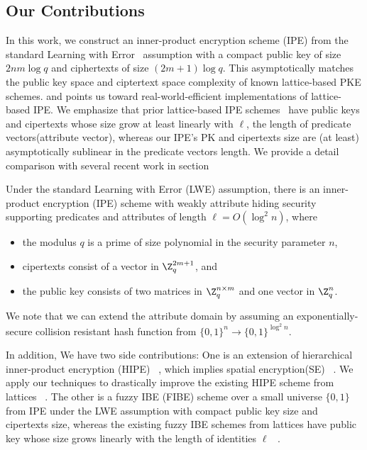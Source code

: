 \subsection{Our Contributions}
In this work, we construct an inner-product encryption scheme (IPE) from the standard Learning with Error~ \cite{STOC:Regev05} assumption with a compact public key of size $2nm\log q$ and ciphertexts of size $(2m+1)\log q$. This asymptotically matches the public key space and ciptertext space complexity of known lattice-based PKE schemes. and points us toward real-world-efficient implementations of lattice-based IPE. We emphasize that prior lattice-based IPE schemes~ \cite{AC:AgrFreVai11, PKC:Xagawa13} have public keys and cipertexts whose size grow at least linearly with $\ell$, the length of predicate vectors(attribute vector), whereas our IPE's PK and cipertexts size are (at least) asymptotically sublinear in the predicate vectors length. We provide a detail comparison with several recent work in section
\begin{theorem}[Main]
Under the standard Learning with Error (LWE) assumption, there is an inner-product encryption (IPE) scheme with weakly attribute hiding security supporting predicates and attributes of length $\ell=O(\log^{2} n)$, where
\begin{itemize}
 \item the modulus $q$ is a prime of size polynomial in the security parameter $n$,
 \item cipertexts consist of a vector in $\Z^{2m+1}_{q}$, and
 \item the public key consists of two matrices in $\Z^{n \times m}_{q}$ and one vector in $\Z^{n}_{q}$.
\end{itemize}
\end{theorem}
We note that we can extend the attribute domain by assuming an exponentially-secure collision resistant hash function from $\{0,1\}^{n}\rightarrow \{0,1\}^{\log^{2}n}$.\

In addition, We have two side contributions: One is an extension of hierarchical inner-product encryption (HIPE)~ \cite{AC:OkaTak09}, which implies spatial encryption(SE)~ \cite{AC:BonHam08}. We apply our techniques to drastically improve the existing HIPE scheme from lattices ~\cite{LC:AbdDeCMoc12, PKC:Xagawa13}. The other is a fuzzy IBE (FIBE) scheme over a small universe $\{0,1\}$ from IPE under the LWE assumption with compact public key size and cipertexts size, whereas the existing fuzzy IBE schemes from lattices have public key whose size grows linearly with  the length of identities $\ell$~ \cite{PKC:ABVVW12, PKC:Xagawa13}.

